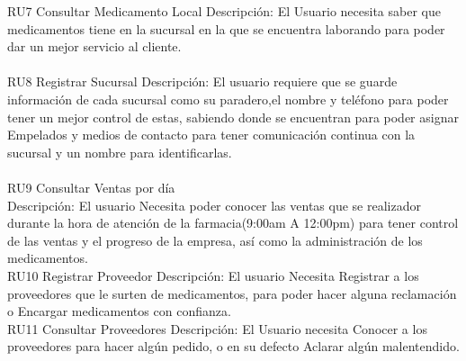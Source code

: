 RU7 Consultar Medicamento Local
Descripción: El Usuario necesita saber que medicamentos tiene en la sucursal en la que se encuentra laborando para poder dar un mejor servicio al cliente.\\
\\
RU8 Registrar Sucursal
Descripción: El usuario requiere que se guarde información de cada sucursal como su paradero,el nombre y teléfono para poder tener un mejor control de estas, sabiendo donde se encuentran para poder asignar Empelados y medios de contacto para tener comunicación continua con la sucursal y un nombre para identificarlas.\\
\\
RU9 Consultar Ventas por día\\
Descripción: El usuario Necesita poder conocer las ventas que se realizador durante la hora de atención de la farmacia(9:00am A 12:00pm) para tener control de las ventas y el progreso de la empresa, así como la administración de los medicamentos.\\
RU10 Registrar Proveedor
Descripción: El usuario Necesita Registrar a los proveedores que le surten de medicamentos, para poder hacer alguna reclamación o Encargar medicamentos con confianza.
\\
RU11 Consultar Proveedores
Descripción: El Usuario necesita Conocer a los proveedores para hacer algún pedido,
o en su defecto Aclarar algún malentendido.

